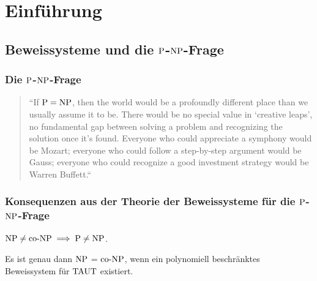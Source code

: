 \section{Einführung} 
\subsection{Beweissysteme und die $\P$-$\NP$-Frage}

\begin{frame}
  \frametitle{Die \(\P\)-\(\NP\)-Frage}
  
  \begin{quotation}
    ``If \(\P=\NP\), then the world would be a profoundly different place than we usually assume it to be. There would be no special value in `creative leaps', no fundamental gap between solving a problem and recognizing the solution once it's found. Everyone who could appreciate a symphony would be Mozart; everyone who could follow a step-by-step argument would be Gauss; everyone who could recognize a good investment strategy would be Warren Buffett.``
  \end{quotation}
  
   
\end{frame}

\begin{frame}
  \frametitle{Konsequenzen aus der Theorie der Beweissysteme für die \(\P\)-\(\NP\)-Frage}
  
  \begin{lemma}
    \(\NP \neq \coNP \implies \P \neq \NP\).
  \end{lemma}  
 
  \pause
  
  \begin{proposition} \label{prpNPcoNP}
    Es ist genau dann \(\NP\) = \(\coNP\), wenn ein polynomiell beschränktes Beweissystem für \(\TAUT\) existiert.
  \end{proposition}
  
\end{frame}

